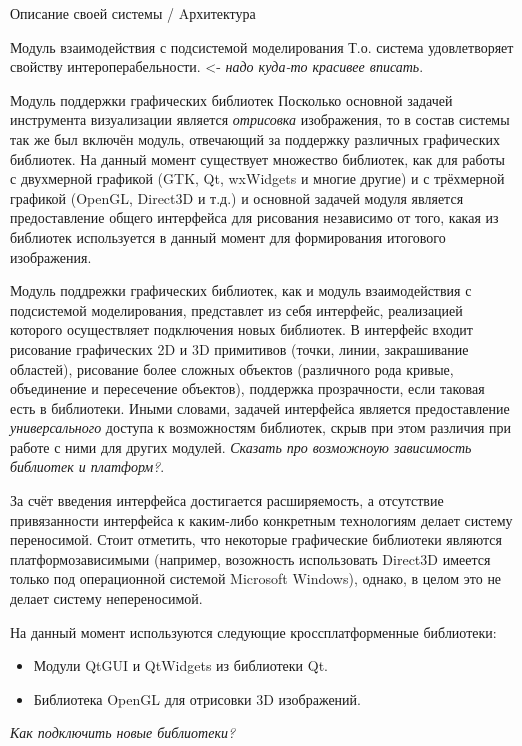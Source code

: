 \documentclass[a4paper,12pt]{extarticle}
\begin{document}
\begin{section}{Описание своей системы / Aрхитектура}
\begin{subsection}{Модуль взаимодействия с подсистемой моделирования}
    Т.о. система удовлетворяет свойству интероперабельности. <- \textit{надо куда-то красивее вписать}.
\end{subsection}

\begin{subsection}{Модуль поддержки графических библиотек}
    Посколько основной задачей инструмента визуализации является \textit{отрисовка} изображения, то в состав системы так же был включён модуль, отвечающий за поддержку различных графических библиотек. На данный момент существует множество библиотек, как для работы с двухмерной графикой (GTK, Qt, wxWidgets и многие другие) и с трёхмерной графикой (OpenGL, Direct3D и т.д.) и основной задачей модуля является предоставление общего интерфейса для рисования независимо от того, какая из библиотек используется в данный момент для формирования итогового изображения.

    Модуль поддрежки графических библиотек, как и модуль взаимодействия с подсистемой моделирования, представлет из себя интерфейс, реализацией которого осуществляет подключения новых библиотек. В интерфейс входит рисование графических 2D и 3D примитивов (точки, линии, закрашивание областей), рисование более сложных объектов (различного рода кривые, объединение и пересечение объектов), поддержка прозрачности, если таковая есть в библиотеки. Иными словами, задачей интерфейса является предоставление \textit{универсального} доступа к возможностям библиотек, скрыв при этом различия при работе с ними для других модулей. \textit{Сказать про возможноую зависимость библиотек и платформ?}.

    За счёт введения интерфейса достигается расширяемость, а отсутствие привязанности интерфейса к каким-либо конкретным технологиям делает систему переносимой. Стоит отметить, что некоторые графические библиотеки являются платформозависимыми (например, возожность использовать Direct3D имеется только под операционной системой Microsoft Windows), однако, в целом это не делает систему непереносимой.

    На данный момент используются следующие кроссплатформенные библиотеки:
    \begin{itemize}
        \item Модули QtGUI и QtWidgets из библиотеки Qt.
        \item Библиотека OpenGL для отрисовки 3D изображений.
    \end{itemize}
    \textit{Как подключить новые библиотеки?}
\end{subsection}


\end{section}
\end{document}
